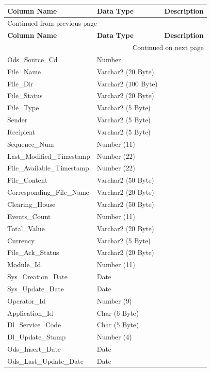 \documentclass[12pt,twoside]{article}
\begin{document}
\begin{longtable}{l|l|l}
\hline
\textbf{Column Name} & \textbf{Data Type} & \textbf{Description}\\
\hline
\endfirsthead
\multicolumn{3}{l}{Continued from previous page} \\
\hline

\textbf{Column Name} & \textbf{Data Type} & \textbf{Description} \\

\hline
\endhead
\hline\multicolumn{3}{r}{Continued on next page} \\
\endfoot
\endlastfoot
\hline
Ods\_Source\_Cd & Number & \\
File\_Name & Varchar2 (20 Byte) & \\
File\_Dir & Varchar2 (100 Byte) & \\
File\_Status & Varchar2 (20 Byte) & \\
File\_Type & Varchar2 (5 Byte) & \\
Sender & Varchar2 (5 Byte) & \\
Recipient & Varchar2 (5 Byte) & \\
Sequence\_Num & Number (11) & \\
Last\_Modified\_Timestamp & Number (22) & \\
File\_Available\_Timestamp & Number (22) & \\
File\_Content & Varchar2 (50 Byte) & \\
Corresponding\_File\_Name & Varchar2 (20 Byte) & \\
Clearing\_House & Varchar2 (50 Byte) & \\
Events\_Count & Number (11) & \\
Total\_Value & Varchar2 (20 Byte) & \\
Currency & Varchar2 (5 Byte) & \\
File\_Ack\_Status & Varchar2 (20 Byte) & \\
Module\_Id & Number (11) & \\
Sys\_Creation\_Date & Date & \\
Sys\_Update\_Date & Date & \\
Operator\_Id & Number (9) & \\
Application\_Id & Char (6 Byte) & \\
Dl\_Service\_Code & Char (5 Byte) & \\
Dl\_Update\_Stamp & Number (4) & \\
Ods\_Insert\_Date & Date & \\
Ods\_Last\_Update\_Date & Date & \\
\hline
\end{longtable}
\end{document}
